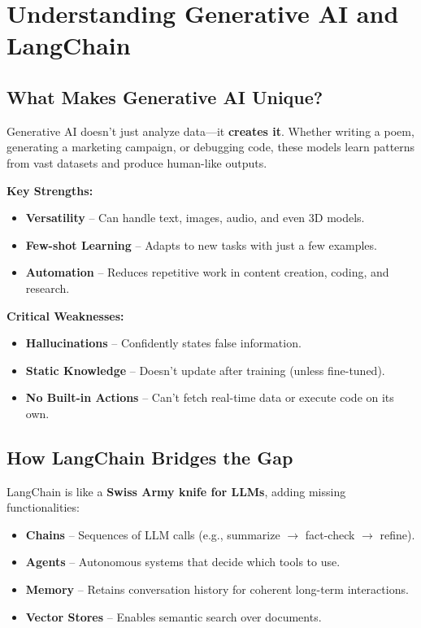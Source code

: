 \documentclass[12pt,a4paper]{article}
\begin{document}
\section{Understanding Generative AI and LangChain}
\subsection{What Makes Generative AI Unique?}
Generative AI doesn't just analyze data—it \textbf{creates it}. Whether writing a poem, generating a marketing campaign, or debugging code, these models learn patterns from vast datasets and produce human-like outputs.

\textbf{Key Strengths:}
\begin{itemize}
    \item \textbf{Versatility} -- Can handle text, images, audio, and even 3D models.
    \item \textbf{Few-shot Learning} -- Adapts to new tasks with just a few examples.
    \item \textbf{Automation} -- Reduces repetitive work in content creation, coding, and research.
\end{itemize}

\textbf{Critical Weaknesses:}
\begin{itemize}
    \item \textbf{Hallucinations} -- Confidently states false information.
    \item \textbf{Static Knowledge} -- Doesn't update after training (unless fine-tuned).
    \item \textbf{No Built-in Actions} -- Can't fetch real-time data or execute code on its own.
\end{itemize}

\subsection{How LangChain Bridges the Gap}
LangChain is like a \textbf{Swiss Army knife for LLMs}, adding missing functionalities:
\begin{itemize}
    \item \textbf{Chains} -- Sequences of LLM calls (e.g., summarize $\rightarrow$ fact-check $\rightarrow$ refine).
    \item \textbf{Agents} -- Autonomous systems that decide which tools to use.
    \item \textbf{Memory} -- Retains conversation history for coherent long-term interactions.
    \item \textbf{Vector Stores} -- Enables semantic search over documents.
\end{itemize}
\end{document}

